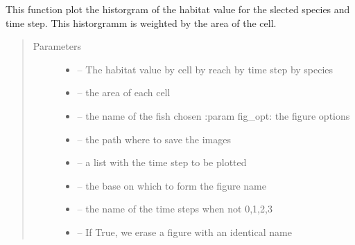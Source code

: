 \documentclass[letterpaper,10pt,english]{sphinxmanual}
\begin{document}
\begin{fulllineitems}
\label{\detokenize{index:src.calcul_hab.plot_hist_biology}}
This function plot the historgram of the habitat value for the slected species and time step. This historgramm
is weighted by the area of the cell.
\begin{quote}\begin{description}
\item[{Parameters}] \leavevmode\begin{itemize}
\item {} 
 -- The habitat value by cell by reach by time step by species

\item {} 
 -- the area of each cell

\item {} 
 -- the name of the fish chosen
:param fig\_opt: the figure options

\item {} 
 -- the path where to save the images

\item {} 
 -- a list with the time step to be plotted

\item {} 
 -- the base on which to form the figure name

\item {} 
 -- the name of the time steps when not 0,1,2,3

\item {} 
 -- If True, we erase a figure with an identical name

\end{itemize}

\end{description}\end{quote}

\end{fulllineitems}

\end{document}
